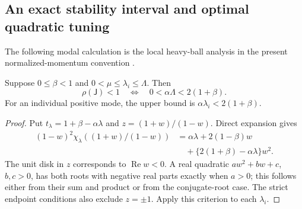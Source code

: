 \subsection{An exact stability interval and optimal quadratic tuning}
The following modal calculation is the local heavy-ball analysis
in the present normalized-momentum convention
\cite{lessard2016iqc}.

\begin{theorem}
\label{thm:local-schur}
Suppose $0\leq\beta<1$ and $0<\mu\leq\lambda_i\leq\Lambda$.
Then
\begin{equation}
\rho(\mathsf J)<1
\quad\Longleftrightarrow\quad
0<\alpha\Lambda<2(1+\beta).
\label{eq:local-schur}
\end{equation}
For an individual positive mode, the upper bound is
$\alpha\lambda_i<2(1+\beta)$.
\end{theorem}
\begin{proof}
Put $t_\lambda=1+\beta-\alpha\lambda$ and
$z=(1+w)/(1-w)$. Direct expansion gives
\begin{align}
(1-w)^2\chi_\lambda((1+w)/(1-w))
&=\alpha\lambda+2(1-\beta)w\\
&\quad+\{2(1+\beta)-\alpha\lambda\}w^2 .
\end{align}
The unit disk in $z$ corresponds to $\operatorname{Re}w<0$.
A real quadratic $aw^2+bw+c$, $b,c>0$, has both roots with
negative real parts exactly when $a>0$; this follows either from
their sum and product or from the conjugate-root case.
The strict endpoint conditions also exclude $z=\pm1$.
Apply this criterion to each $\lambda_i$.
\end{proof}

